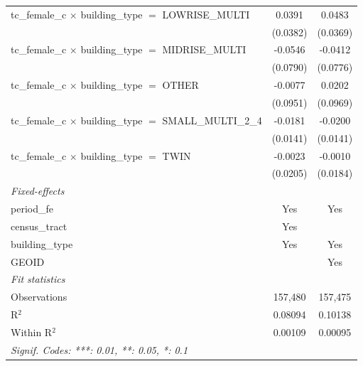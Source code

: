 \begin{tabular}{lcc}
   tc\_female\_c $\times$ building\_type $=$ LOWRISE\_MULTI            & 0.0391          & 0.0483\\   
                                                                       & (0.0382)        & (0.0369)\\   
   tc\_female\_c $\times$ building\_type $=$ MIDRISE\_MULTI            & -0.0546         & -0.0412\\   
                                                                       & (0.0790)        & (0.0776)\\   
   tc\_female\_c $\times$ building\_type $=$ OTHER                     & -0.0077         & 0.0202\\   
                                                                       & (0.0951)        & (0.0969)\\   
   tc\_female\_c $\times$ building\_type $=$ SMALL\_MULTI\_2\_4        & -0.0181         & -0.0200\\   
                                                                       & (0.0141)        & (0.0141)\\   
   tc\_female\_c $\times$ building\_type $=$ TWIN                      & -0.0023         & -0.0010\\   
                                                                       & (0.0205)        & (0.0184)\\   
   \midrule
   \emph{Fixed-effects}\\
   period\_fe                                                          & Yes             & Yes\\  
   census\_tract                                                       & Yes             & \\  
   building\_type                                                      & Yes             & Yes\\  
   GEOID                                                               &                 & Yes\\  
   \midrule
   \emph{Fit statistics}\\
   Observations                                                        & 157,480         & 157,475\\  
   R$^2$                                                               & 0.08094         & 0.10138\\  
   Within R$^2$                                                        & 0.00109         & 0.00095\\  
   \midrule \midrule
   \multicolumn{3}{l}{\emph{Signif. Codes: ***: 0.01, **: 0.05, *: 0.1}}\\
\end{tabular}
\par\endgroup
